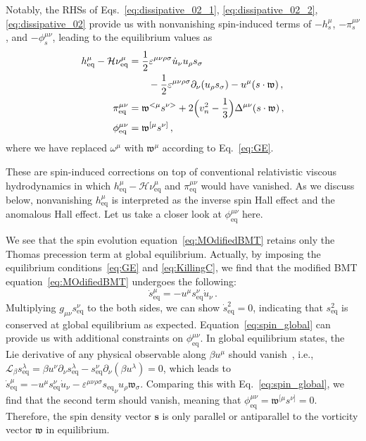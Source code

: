 \documentclass[prl,superscriptaddress,twocolumn,
  showpacs,preprintnumbers,amsmath,amssymb]{revtex4-1}
\newcommand{\vOmega}{\mathfrak{w}}
\begin{document}
Notably, the RHSs of Eqs.~\eqref{eq:dissipative_02_1}, \eqref{eq:dissipative_02_2}, \eqref{eq:dissipative_02} provide us with nonvanishing spin-induced terms of $-h_s^\mu$, $-\pi_s^{\mu\nu}$, and $-\phi_s^{\mu\nu}$, leading to the equilibrium values as
\begin{align}
  h_{\text{eq}}^{\mu} - \mathcal{H}\nu_{\text{eq}}^{\mu}
  & = \frac{1}{2} \varepsilon^{\mu\nu\rho\sigma} \dot{u}_\nu u_\rho s_\sigma \notag\\
  &\qquad  - \frac{1}{2} \varepsilon^{\mu\nu\rho\sigma}\partial_\nu (u_\rho s_\sigma)  - u^\mu (s\cdot\vOmega)\,, \notag \\
  \pi_{\text{eq}}^{\mu\nu} & = \vOmega^{<\mu}s^{\nu>} + 2\Bigl(v_n^2 - \frac{1}{3}\Bigr) \Delta^{\mu\nu}(s\cdot\vOmega) \,, \notag \\
  \phi_{\text{eq}}^{\mu\nu} & = \vOmega^{[\mu} s^{\nu]}\,,
\label{eq:hydro_global}
\end{align}
where we have replaced $\omega^\mu$ with $\vOmega^\mu$ according to Eq.~\eqref{eq:GE}.

These are spin-induced corrections on top of conventional relativistic viscous hydrodynamics in which $h_{\text{eq}}^\mu-\mathcal{H}\nu_{\text{eq}}^\mu$ and $\pi_{\text{eq}}^{\mu\nu}$ would have vanished.  As we discuss below, nonvanishing $h_{\text{eq}}^\mu$ is interpreted as the inverse spin Hall effect and the anomalous Hall effect.  Let us take a closer look at $\phi_{\text{eq}}^{\mu\nu}$ here.

We see that the spin evolution equation~\eqref{eq:MOdifiedBMT} retains only the Thomas precession term at global equilibrium.  Actually, by imposing the equilibrium conditions~\eqref{eq:GE} and \eqref{eq:KillingC}, we find that the modified BMT equation~\eqref{eq:MOdifiedBMT} undergoes the following:
\begin{equation}
  \dot{s}^\mu_{\text{eq}}  =  -u^\mu s^{\nu}_{\text{eq}}\dot{u}_\nu \,.
  \label{eq:spin_global}
\end{equation}
Multiplying $g_{\mu\nu}s^\nu_{\text{eq}}$ to the both sides,
we can show $\dot{s}^2_{\text{eq}}=0$, indicating that $s^{2}_{\textrm{eq}}$ is conserved at global equilibrium as expected.
Equation~\eqref{eq:spin_global} can provide us with additional constraints on $\phi^{\mu\nu}_{\text{eq}}$.  In global equilibrium states, the Lie derivative of any physical observable along $\beta u^\mu$ should vanish~\cite{Becattini:2016stj}, i.e.,
$\mathcal{L}_{\beta }s^{\lambda}_{\text{eq}} = \beta u^{\nu}\partial_{\nu}s^{\lambda}_{\text{eq}} - s^{\nu}_{\text{eq}} \partial_{\nu}(\beta u^\lambda)=0$,
which leads to
$\dot{s}_{\text{eq}}^{\mu} = -u^{\mu}s_{\text{eq}}^{\nu}\dot{u}_{\nu} - \varepsilon^{\mu\nu\rho\sigma}{s_{\text{eq}}}_{\nu}u_{\rho}\vOmega_{\sigma}
$.
Comparing this with Eq.~\eqref{eq:spin_global}, we find that the second term should vanish, meaning that $\phi_{\text{eq}}^{\mu\nu} = \vOmega^{[\mu} s^{\nu]} = 0$.  Therefore, the spin density vector $\boldsymbol{s}$ is only parallel or antiparallel to the vorticity vector $\boldsymbol{\vOmega}$ in equilibrium.
\vspace{0.5em}
\end{document}
